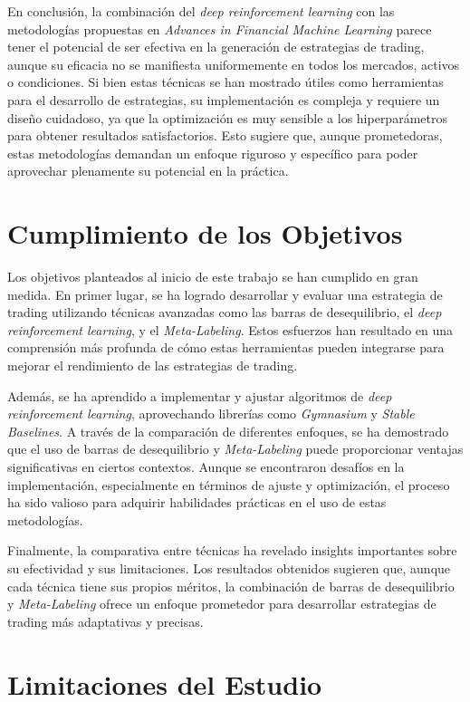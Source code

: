 \documentclass[a4paper,12pt, twoside]{report}
\begin{document}
En conclusión, la combinación del \textit{deep reinforcement learning} con las metodologías 
propuestas en \textit{Advances in Financial Machine Learning} parece tener el potencial 
de ser efectiva en la generación de estrategias de trading, aunque su eficacia no se 
manifiesta uniformemente en todos los mercados, activos o condiciones. Si bien estas 
técnicas se han mostrado útiles como herramientas para el desarrollo de estrategias, 
su implementación es compleja y requiere un diseño cuidadoso, ya que la optimización es 
muy sensible a los hiperparámetros para obtener resultados satisfactorios. Esto sugiere que, 
aunque prometedoras, estas metodologías demandan un enfoque riguroso y específico para 
poder aprovechar plenamente su potencial en la práctica.


\section{Cumplimiento de los Objetivos}

Los objetivos planteados al inicio de este trabajo se han cumplido en gran medida. En 
primer lugar, se ha logrado desarrollar y evaluar una estrategia de trading utilizando 
técnicas avanzadas como las barras de desequilibrio, el \textit{deep reinforcement learning}, 
y el \textit{Meta-Labeling}. Estos esfuerzos han resultado en una comprensión más profunda 
de cómo estas herramientas pueden integrarse para mejorar el rendimiento de las estrategias 
de trading.

Además, se ha aprendido a implementar y ajustar algoritmos de \textit{deep reinforcement learning}, 
aprovechando librerías como \textit{Gymnasium} y \textit{Stable Baselines}. A través de la 
comparación de diferentes enfoques, se ha demostrado que el uso de barras de desequilibrio 
y \textit{Meta-Labeling} puede proporcionar ventajas significativas en ciertos contextos. 
Aunque se encontraron desafíos en la implementación, especialmente en términos de ajuste 
y optimización, el proceso ha sido valioso para adquirir habilidades prácticas en el 
uso de estas metodologías.

Finalmente, la comparativa entre técnicas ha revelado insights importantes sobre su 
efectividad y sus limitaciones. Los resultados obtenidos sugieren que, aunque cada 
técnica tiene sus propios méritos, la combinación de barras de desequilibrio y 
\textit{Meta-Labeling} ofrece un enfoque prometedor para desarrollar estrategias de 
trading más adaptativas y precisas.


\section{Limitaciones del Estudio}
\end{document}
